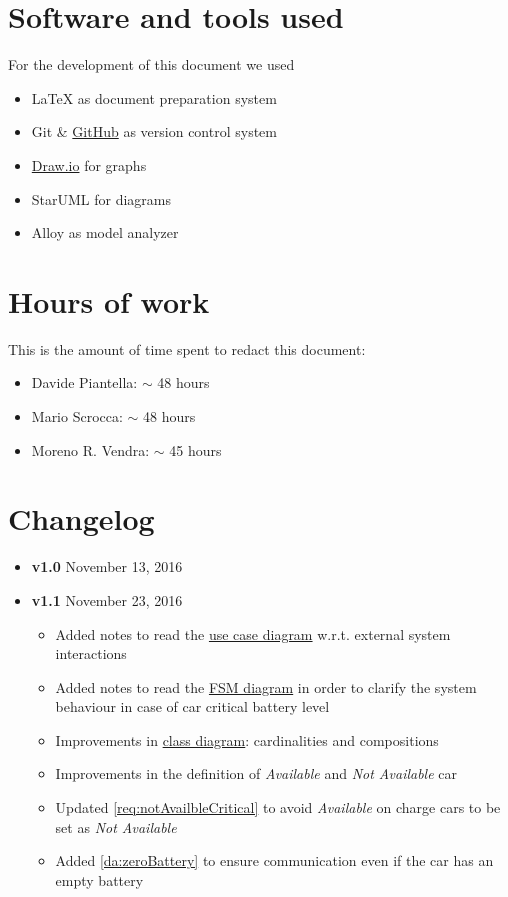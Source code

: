 \begin{appendices}
	\section{Software and tools used}
	For the development of this document we used
	\begin{itemize}
		\item \LaTeX{} as document preparation system
		\item Git \& \href{http://github.com}{GitHub} as version control system
		\item \href{http://draw.io}{Draw.io} for graphs
		\item StarUML for diagrams
		\item Alloy as model analyzer
	\end{itemize}
	
	\section{Hours of work}
	This is the amount of time spent to redact this document:
	\begin{itemize}
		\item Davide Piantella: $\sim$ 48 hours
		\item Mario Scrocca: $\sim$ 48 hours
		\item Moreno R. Vendra: $\sim$ 45 hours
	\end{itemize}
	
	\section{Changelog}
	\begin{itemize}
		\item \textbf{v1.0} November 13, 2016
		\item \textbf{v1.1} November 23, 2016
		\begin{itemize}
			\item Added notes to read the \hyperref[fig:usecase]{use case diagram} w.r.t. external system interactions
			\item Added notes to read the \hyperref[fig:carFSA]{FSM diagram} in order to clarify the system behaviour in case of car critical battery level
			\item Improvements in \hyperref[fig:classDiagram]{class diagram}: cardinalities and compositions
			\item Improvements in the definition of \emph{Available} and \emph{Not Available} car
			\item Updated \ref{req:notAvailbleCritical} to avoid \emph{Available} on charge cars to be set as \emph{Not Available}
			\item Added \ref{da:zeroBattery} to ensure communication even if the car has an empty battery
		\end{itemize}
	\end{itemize}
\end{appendices}
